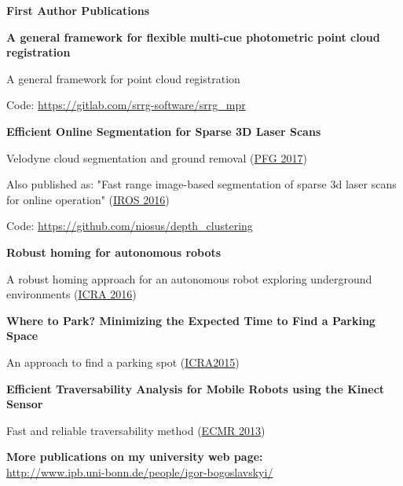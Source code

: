 \documentclass[a4paper,12pt,final]{memoir}
\newcommand{\SmallSep}{\vspace{0.5em}}
\newcommand{\CVSection}[1]
	{\Large\textbf{#1}\par
	\SmallSep\normalsize\normalfont}
\newcommand{\CVItem}[1]
	{\textbf{\color{MidnightBlue} #1}}
\begin{document}
\CVSection{First Author Publications}
\CVItem{A general framework for flexible multi-cue photometric point cloud registration}
\begin{compactitem}[\color{MidnightBlue}$\circ$]
	\item A general framework for point cloud registration
	\item Code: \url{https://gitlab.com/srrg-software/srrg_mpr}
\end{compactitem}
\CVItem{Efficient Online Segmentation for Sparse 3D Laser Scans}
\begin{compactitem}[\color{MidnightBlue}$\circ$]
	\item Velodyne cloud segmentation and ground removal (\href{https://link.springer.com/article/10.1007/s41064-016-0003-y}{PFG 2017})
	\item Also published as: "Fast range image-based segmentation of sparse 3d
	laser scans for online operation" (\href{http://iros2016.org/}{IROS 2016})
	\item Code: \url{https://github.com/niosus/depth_clustering}
\end{compactitem}
\CVItem{Robust homing for autonomous robots}
\begin{compactitem}[\color{MidnightBlue}$\circ$]
	\item A robust homing approach for an autonomous robot exploring underground
	environments (\href{http://icra2016.org/}{ICRA 2016})
\end{compactitem}
\CVItem{Where to Park? Minimizing the Expected Time to Find a Parking Space}
\begin{compactitem}[\color{MidnightBlue}$\circ$]
	\item An approach to find a parking spot (\href{http://icra2015.org/}{ICRA2015})
\end{compactitem}
\CVItem{Efficient Traversability Analysis for Mobile Robots using the Kinect Sensor}
\begin{compactitem}[\color{MidnightBlue}$\circ$]
	\item Fast and reliable traversability method
	(\href{http://www.iri.upc.edu/ecmr13/#home}{ECMR 2013})
\end{compactitem}
\CVItem{More publications on my university web page:}\\
\url{http://www.ipb.uni-bonn.de/people/igor-bogoslavskyi/}\\

\clearpage
\framebreak

\end{document}
